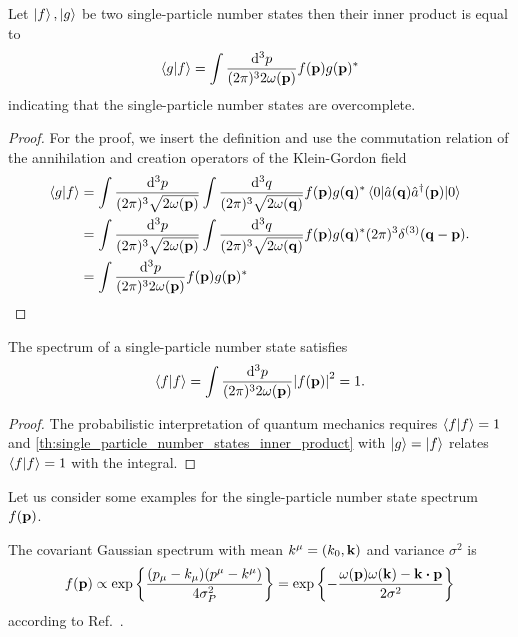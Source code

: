 \begin{lemma}\label{th:single_particle_number_states_inner_product}
	Let $\ket{f},\ket{g}$ be two single-particle number states then their inner product is equal to
	\begin{equation}
		\braket{g}{f}
		=
		\int\frac{\dd[3]{p}}{(2\pi)^32\omega(\vb{p})}
		f(\vb{p})g(\vb{p})^*
	\end{equation}
	indicating that the single-particle number states are overcomplete.
\end{lemma}
\begin{proof}
	For the proof, we insert the definition and use the commutation relation of the annihilation and creation operators of the Klein-Gordon field
	\begin{equation}
		\begin{split}
			\bra{g}\ket{f}
			&=
			\int\frac{\dd[3]{p}}{(2\pi)^3\sqrt{2\omega(\vb{p})}}
			\int\frac{\dd[3]{q}}{(2\pi)^3\sqrt{2\omega(\vb{q})}}
			f(\vb{p})g(\vb{q})^*
			\expval{\hat{a}(\vb{q})\hat{a}^\dagger(\vb{p})}{0}
			\\
			&=
			\int\frac{\dd[3]{p}}{(2\pi)^3\sqrt{2\omega(\vb{p})}}
			\int\frac{\dd[3]{q}}{(2\pi)^3\sqrt{2\omega(\vb{q})}}
			f(\vb{p})g(\vb{q})^*
			(2\pi)^3\delta^{(3)}(\vb{q}-\vb{p})
			\\
			&=
			\int\frac{\dd[3]{p}}{(2\pi)^32\omega(\vb{p})}
			f(\vb{p})g(\vb{p})^*
		\end{split}
		.
	\end{equation}
\end{proof}
\begin{lemma}
	The spectrum of a single-particle number state satisfies
	\begin{equation}
		\bra{f}\ket{f}
		=
		\int\frac{\dd[3]{p}}{(2\pi)^32\omega(\vb{p})}
		\abs{f(\vb{p})}^2
		=
		1
		.
	\end{equation}
\end{lemma}
\begin{proof}
	The probabilistic interpretation of quantum mechanics requires $\braket{f}=1$ and \cref{th:single_particle_number_states_inner_product} with $\ket{g}=\ket{f}$ relates $\braket{f}=1$ with the integral.
\end{proof}
Let us consider some examples for the single-particle number state spectrum $f(\vb{p})$.
\begin{example}
	The covariant Gaussian spectrum with mean $k^\mu=(k_0,\vb{k})$ and variance $\sigma^2$ is
	\begin{equation}
		f(\vb{p})
		\propto
		\exp\left\{
			\frac{(p_\mu-k_\mu)(p^\mu-k^\mu)}{4\sigma_P^2}
		\right\}
		=
		\exp\left\{
			-
			\frac{\omega(\vb{p})\omega(\vb{k})-\vb{k}\vdot\vb{p}}{2\sigma^2}
		\right\}
		\label{eq:covariant_gaussian_spectrum}
	\end{equation}
	according to Ref.~\cite{Naumov2013,Naumov2009}.
\end{example}
